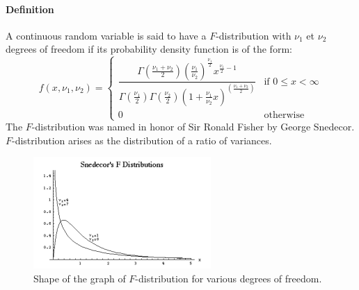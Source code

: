 \paragraph{Definition}
A continuous random variable is said to have a $F$-distribution with
$\nu_{1}$ et $\nu_{2}$ degrees of freedom if its probability density
function is of the form:
$$
f(x,\nu_{1},\nu_{2})=
\left\{
\begin{array}{ll}
	\dfrac{\Gamma\left(\frac{\nu_{1}+\nu_{2}}{2}\right)\left(\frac{\nu_{1}}{\nu_{2}}\right)^{\frac{\nu_{1}}{2}}x^{\frac{\nu_{1}}{2}-1}}{\Gamma\left(\frac{\nu_{1}}{2}\right)\Gamma\left(\frac{\nu_{2}}{2}\right)\left(1+\frac{\nu_{1}}{\nu_{2}}x\right)^{\left(\frac{\nu_{1}+\nu_{2}}{2}\right)}} & \mbox{if } 0\leq x < \infty\\
	0 & \mbox{otherwise}
\end{array}
\right.
$$
The $F$-distribution was named in honor of Sir Ronald Fisher by George
Snedecor. $F$-distribution arises as the distribution of a ratio of 
variances.
\begin{figure}[H]
	\begin{center}
		\includegraphics[width=.5\textwidth]{./chaps/23sec/images/2Snedecor_F_distribution.png}
	\end{center}
	\caption{Shape of the graph of $F$-distribution for various degrees of freedom.}
	\label{fig:23sec_F_distribution}
\end{figure}
